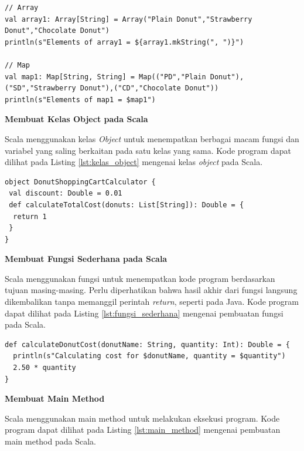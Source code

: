\documentclass[a4paper,twoside]{article}
\begin{document}
\begin{enumerate}
\begin{lstlisting}[basicstyle=\ttfamily, frame=single,
	columns=fullflexible, keepspaces=true, breaklines=true, label=lst:mutable_collection, caption=Membuat mutable collection pada Scala]
// Array
val array1: Array[String] = Array("Plain Donut","Strawberry Donut","Chocolate Donut")
println(s"Elements of array1 = ${array1.mkString(", ")}")

// Map
val map1: Map[String, String] = Map(("PD","Plain Donut"),("SD","Strawberry Donut"),("CD","Chocolate Donut"))
println(s"Elements of map1 = $map1")
\end{lstlisting}

\textbf{Membuat Kelas Object pada Scala}

Scala menggunakan kelas \textit{Object} untuk menempatkan berbagai macam fungsi dan variabel yang saling berkaitan pada satu kelas yang sama. Kode program dapat dilihat pada Listing \ref{lst:kelas_object} mengenai kelas \textit{object} pada Scala.

\begin{lstlisting}[basicstyle=\ttfamily, frame=single,
	columns=fullflexible, keepspaces=true, breaklines=true, label=lst:kelas_object, caption=Membuat Kelas Object pada Scala]
object DonutShoppingCartCalculator {
 val discount: Double = 0.01
 def calculateTotalCost(donuts: List[String]): Double = {
  return 1
 }
}
\end{lstlisting}

\textbf{Membuat Fungsi Sederhana pada Scala}

Scala menggunakan fungsi untuk menempatkan kode program berdasarkan tujuan masing-masing. Perlu diperhatikan bahwa hasil akhir dari fungsi langsung dikembalikan tanpa memanggil perintah \textit{return}, seperti pada Java. Kode program dapat dilihat pada Listing \ref{lst:fungsi_sederhana} mengenai pembuatan fungsi pada Scala.

\begin{lstlisting}[basicstyle=\ttfamily, frame=single,
	columns=fullflexible, keepspaces=true, breaklines=true, label=lst:fungsi_sederhana, caption=Membuat Fungsi Sedehana pada Scala]
def calculateDonutCost(donutName: String, quantity: Int): Double = {
  println(s"Calculating cost for $donutName, quantity = $quantity")
  2.50 * quantity
}
\end{lstlisting}


\textbf{Membuat Main Method}

Scala menggunakan main method untuk melakukan eksekusi program. Kode program dapat dilihat pada Listing \ref{lst:main_method} mengenai pembuatan main method pada Scala.


\end{enumerate}
\end{document}
